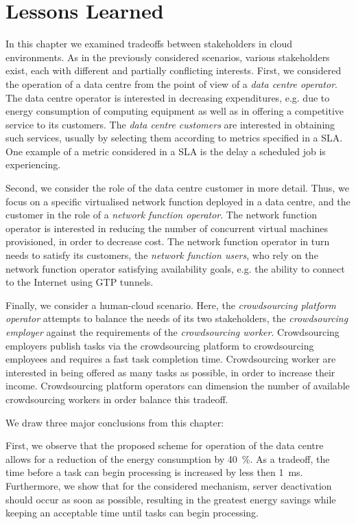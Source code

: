 \section{Lessons Learned}\label{sec:cloud:lessons_learned}
In this chapter we examined tradeoffs between stakeholders in cloud environments.
As in the previously considered scenarios, various stakeholders exist, each with different and partially conflicting interests.
First, we considered the operation of a data centre from the point of view of a \emph{data centre operator}.
The data centre operator is interested in decreasing expenditures, e.g. due to energy consumption of computing equipment as well as in offering a competitive service to its customers.
The \emph{data centre customers} are interested in obtaining such services, usually by selecting them according to metrics specified in a \gls{SLA}.
One example of a metric considered in a \gls{SLA} is the delay a scheduled job is experiencing.

Second, we consider the role of the data centre customer in more detail.
Thus, we focus on a specific virtualised network function deployed in a data centre, and the customer in the role of a \emph{network function operator}.
The network function operator is interested in reducing the number of concurrent virtual machines provisioned, in order to decrease cost.
The network function operator in turn needs to satisfy its customers, the \emph{network function users}, who rely on the network function operator satisfying availability goals, e.g. the ability to connect to the Internet using \gls{GTP} tunnels.

Finally, we consider a human-cloud scenario.
Here, the \emph{crowdsourcing platform operator} attempts to balance the needs of its two stakeholders, the \emph{crowdsourcing employer} against the requirements of the \emph{crowdsourcing worker}.
Crowdsourcing employers publish tasks via the crowdsourcing platform to crowdsourcing employees and requires a fast task completion time.
Crowdsourcing worker are interested in being offered as many tasks as possible, in order to increase their income.
Crowdsourcing platform operators can dimension the number of available crowdsourcing workers in order balance this tradeoff. 

We draw three major conclusions from this chapter:

First, we observe that the proposed scheme for operation of the data centre allows for a reduction of the energy consumption by \SI{40}{\percent}.
As a tradeoff, the time before a task can begin processing is increased by less then \SI{1}{\milli\second}.
Furthermore, we show that for the considered mechanism, server deactivation should occur as soon as possible, resulting in the greatest energy savings while keeping an acceptable time until tasks can begin processing. 

